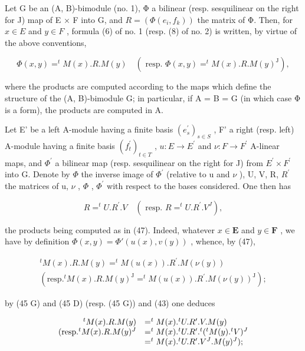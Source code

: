 Let G be an (A, B)-bimodule (no. 1), Φ a bilinear (resp. sesquilinear on the right for J) map of E × F into G, and \(R = (\Phi(e_i, f_k))\) the matrix of Φ. Then, for \(x \in E\) and \(y \in F\) , formula (6) of no. 1 (resp. (8) of no. 2) is written, by virtue of the above conventions,

\[
\Phi (x, y) = ^ {t} M (x). R. M (y) \quad (\text { resp. } \Phi (x, y) = ^ {t} M (x). R. M (y) ^ {\mathrm{J}}),\tag{47}
\]

where the products are computed according to the maps which define the structure of the (A, B)-bimodule G; in particular, if A = B = G (in which case Φ is a form), the products are computed in A.

Let E' be a left A-module having a finite basis \((e_{s}^{\prime})_{s\in S}\) , F' a right (resp. left) A-module having a finite basis \((f_{t}^{\prime})_{t\in T}\) , \(u:E\to E^{\prime}\) and \(\nu:F\to F^{\prime}\) A-linear maps, and \(\Phi^{\prime}\) a bilinear map (resp. sesquilinear on the right for J) from \(E^{\prime}\times F^{\prime}\) into G. Denote by \(\Phi\) the inverse image of \(\Phi^{\prime}\) (relative to u and \(\nu\) ), U, V, R, \(R^{\prime}\) the matrices of u, \(\nu\) , \(\Phi\) , \(\Phi^{\prime}\) with respect to the bases considered. One then has

\[
R = ^ {t} U. R ^ {\prime}. V \quad (\text { resp. } R = ^ {t} U. R ^ {\prime}. V ^ {J}),\tag{48}
\]

the products being computed as in (47). Indeed, whatever \(x \in \mathbf{E}\) and \(y \in \mathbf{F}\) , we have by definition \(\Phi(x, y) = \Phi'(u(x), v(y))\) , whence, by (47),

\[
\begin{array}{c} ^ {t} M (x). R. M (y) = ^ {t} M (u (x)). R ^ {\prime}. M (\nu (y)) \\ (\text {resp.} ^ {t} M (x). R. M (y) ^ {\mathrm{J}} = ^ {t} M (u (x)). R ^ {\prime}. M (\nu (y)) ^ {\mathrm{J}}); \end{array}
\]

by (45 G) and (45 D) (resp. (45 G)) and (43) one deduces

\[
\begin{array}{r l} ^ {t} M (x). R. M (y) & = ^ {t} M (x). ^ {t} U. R ^ {\prime}. V. M (y) \\ (\text {resp.} ^ {t} M (x). R. M (y) ^ {J} & = ^ {t} M (x). ^ {t} U. R ^ {\prime}. ^ {t} (^ {t} M (y). ^ {t} V) ^ {J} \\ & = ^ {t} M (x). ^ {t} U. R ^ {\prime}. V ^ {J}. M (y) ^ {J}); \end{array}
\]

